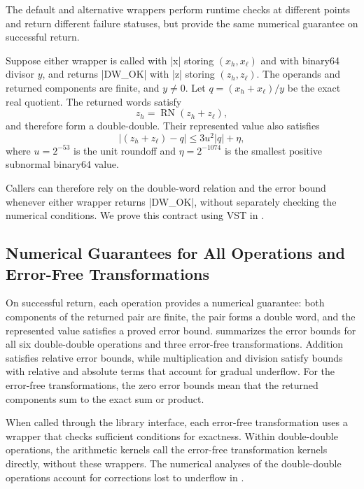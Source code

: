 The default and alternative wrappers perform runtime checks at different
points and return different failure statuses, but provide the same numerical
guarantee on successful return.

\begin{theorem}
\label{thm:division-wrapper-contract}
Suppose either wrapper is called with \ccode|x| storing
$(x_h,x_\ell)$ and with binary64 divisor $y$, and returns
\ccode|DW_OK| with \ccode|z| storing $(z_h,z_\ell)$.
The operands and returned components are finite, and $y\neq0$.
Let $q=(x_h+x_\ell)/y$ be the exact real quotient.
The returned words satisfy
\[
  z_h=\operatorname{RN}(z_h+z_\ell),
\]
and therefore form a double-double. Their represented value also satisfies
\[
  \left|(z_h+z_\ell)-q\right|
  \leq 3u^2|q|+\eta,
\]
where $u=2^{-53}$ is the unit roundoff and $\eta=2^{-1074}$ is the smallest
positive subnormal binary64 value.
\end{theorem}

Callers can therefore rely on the double-word relation and the error
bound whenever either wrapper returns \ccode|DW_OK|, without separately
checking the numerical conditions. We prove this contract using VST
in .

\subsection{Numerical Guarantees for All Operations and 
Error-Free Transformations}
\label{sec:overview-library-guarantees}
On successful return, each \FenceDD{} operation provides a numerical
guarantee: both components of the returned pair are finite, the pair forms a
double word, and the represented value satisfies a proved error
bound.
 summarizes the error bounds
 for all six double-double operations and three error-free
transformations. Addition satisfies relative error bounds, while
multiplication and division satisfy bounds with relative and absolute
terms that account for gradual underflow. For the error-free
transformations, the zero error bounds mean that the returned
components sum to the exact sum or product.

When called through the library interface, each error-free
transformation uses a wrapper that checks sufficient conditions for
exactness. Within double-double operations, the arithmetic kernels
call the error-free transformation kernels directly, without these wrappers.
The numerical analyses of the double-double operations account for
corrections lost to underflow in \FastTwoMult{}.


